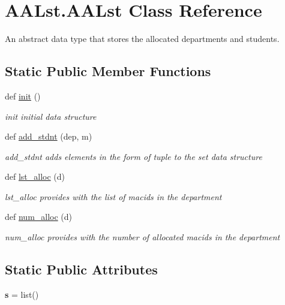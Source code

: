 \hypertarget{class_a_a_lst_1_1_a_a_lst}{}\section{A\+A\+Lst.\+A\+A\+Lst Class Reference}
\label{class_a_a_lst_1_1_a_a_lst}


An abstract data type that stores the allocated departments and students.  


\subsection*{Static Public Member Functions}
\begin{DoxyCompactItemize}
\item 
\mbox{\label{class_a_a_lst_1_1_a_a_lst_ade2ae95f7a0e7ad568b8fdcccdc18556}} 
def \mbox{\hyperlink{class_a_a_lst_1_1_a_a_lst_ade2ae95f7a0e7ad568b8fdcccdc18556}{init}} ()
\begin{DoxyCompactList}\small\item\em init initial data structure \end{DoxyCompactList}\item 
def \mbox{\hyperlink{class_a_a_lst_1_1_a_a_lst_a6cc4b320d445656b347115c3d440be45}{add\+\_\+stdnt}} (dep, m)
\begin{DoxyCompactList}\small\item\em add\+\_\+stdnt adds elements in the form of tuple to the set data structure \end{DoxyCompactList}\item 
def \mbox{\hyperlink{class_a_a_lst_1_1_a_a_lst_aecd1653cb6c7db79cff37d34294a9fc2}{lst\+\_\+alloc}} (d)
\begin{DoxyCompactList}\small\item\em lst\+\_\+alloc provides with the list of macids in the department \end{DoxyCompactList}\item 
def \mbox{\hyperlink{class_a_a_lst_1_1_a_a_lst_a7751d151fd74a6ea51e662ab9f69284a}{num\+\_\+alloc}} (d)
\begin{DoxyCompactList}\small\item\em num\+\_\+alloc provides with the number of allocated macids in the department \end{DoxyCompactList}\end{DoxyCompactItemize}
\subsection*{Static Public Attributes}
\begin{DoxyCompactItemize}
\item 
\mbox{\label{class_a_a_lst_1_1_a_a_lst_a100f6b123aa0905173d59a87df350be7}} 
{\bfseries s} = list()
\end{DoxyCompactItemize}


